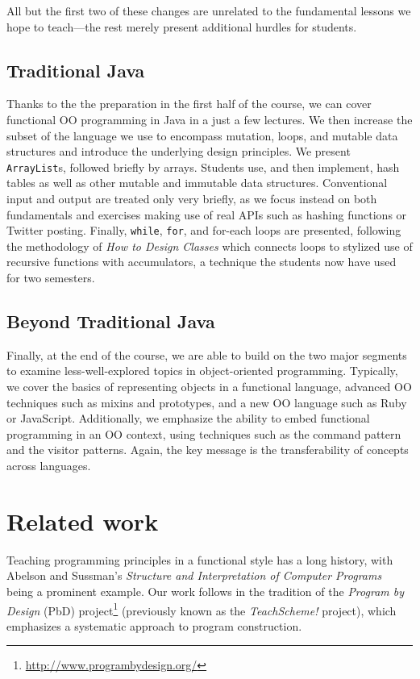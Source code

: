 \documentclass[submission,copyright]{eptcs}
\def\htdc{\emph{How to Design Classes}\xspace}
\begin{document}
All but the first two of these changes are unrelated to the
fundamental lessons we hope to teach---the rest merely present
additional hurdles for students.

\subsection{Traditional Java}

Thanks to the the preparation in the first half of the course, we can
cover functional OO programming in Java in a just a few lectures.  We
then increase the subset of the language we use to encompass mutation,
loops, and mutable data structures and introduce the underlying design
principles. We present \texttt{ArrayList}s, followed briefly by
arrays. Students use, and then implement, hash tables as well as other
mutable and immutable data structures.  Conventional input and output
are treated only very briefly, as we focus instead on both
fundamentals and exercises making use of real APIs such as hashing
functions or Twitter posting.  Finally, \texttt{while}, \texttt{for},
and for-each loops are presented, following the methodology of \htdc
which connects loops to stylized use of recursive functions with
accumulators, a technique the students now have used for two semesters.

\subsection{Beyond Traditional Java}

Finally, at the end of the course, we are able to build on the two
major segments to examine less-well-explored topics in object-oriented
programming.  Typically, we cover the basics of representing objects
in a functional language, advanced OO techniques such as mixins and
prototypes, and a new OO language such as Ruby or JavaScript.
Additionally, we emphasize the ability to embed functional programming
in an OO context, using techniques such as the command pattern and the
visitor patterns.  Again, the key message is the transferability of
concepts across languages.



\section{Related work}
\label{sec:related-work}

Teaching programming principles in a functional style has a long
history, with Abelson and Sussman's \emph{Structure and Interpretation
  of Computer Programs}~\cite{dvanhorn:sicp} being a prominent
example.  Our work follows in the tradition of the \emph{Program by
  Design} (PbD)
project\footnote{\url{http://www.programbydesign.org/}} (previously
known as the \emph{TeachScheme!} project), which emphasizes a
systematic approach to program construction.
\end{document}
